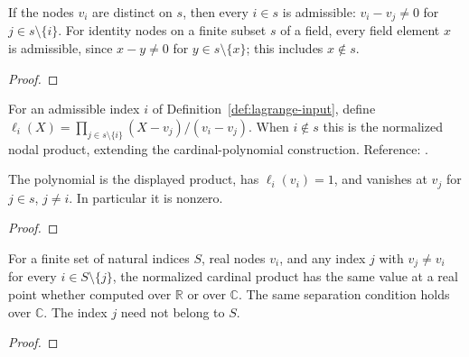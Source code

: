\begin{supporting}
\begin{theorem}
\label{thm:lagrange-input}
\leanok
If the nodes $v_i$ are distinct on $s$, then every $i\in s$ is admissible:
$v_i-v_j\ne0$ for $j\in s\setminus\{i\}$.
For identity nodes on a finite subset $s$ of a field, every field element $x$
is admissible, since $x-y\ne0$ for $y\in s\setminus\{x\}$; this includes $x\notin s$.
\end{theorem}
\begin{proof}
\leanok
\end{proof}

\begin{definition}
\label{def:lagrange-basis}
\leanok
For an admissible index $i$ of Definition~\ref{def:lagrange-input}, define
$\ell_i(X)=\prod_{j\in s\setminus\{i\}}(X-v_j)/(v_i-v_j)$.
When $i\notin s$ this is the normalized nodal product, extending the
cardinal-polynomial construction. Reference: \cite[3.3(i)]{dlmf}.
\end{definition}

\begin{theorem}
\label{thm:lagrange-basis}
\leanok
The polynomial is the displayed product, has $\ell_i(v_i)=1$, and vanishes
at $v_j$ for $j\in s$, $j\ne i$. In particular it is nonzero.
\end{theorem}
\begin{proof}
\leanok
\end{proof}

\begin{theorem}
\label{thm:lagrange-complex}
\leanok
For a finite set of natural indices $S$, real nodes $v_i$, and any index $j$
with $v_j\ne v_i$ for every $i\in S\setminus\{j\}$, the normalized cardinal
product has the same value at a real point whether computed over $\mathbb R$
or over $\mathbb C$. The same separation condition holds over $\mathbb C$.
The index $j$ need not belong to $S$.
\end{theorem}
\begin{proof}
\leanok
\end{proof}


\end{supporting}
